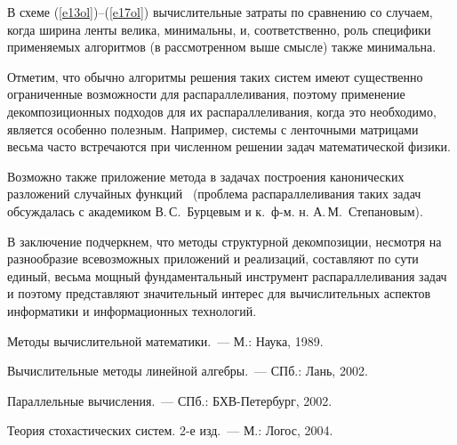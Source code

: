 \begin{multicols}{2}
     В схеме (\ref{e13ol})--(\ref{e17ol}) вычислительные затраты по
сравнению со случаем, когда ширина ленты велика, минимальны, и,
соответственно, роль специфики применяемых алгоритмов (в рассмотренном
выше смысле) также минимальна. 

Отметим, что обычно алгоритмы решения
\mbox{таких} систем имеют существенно ограниченные %
возможности для
распараллеливания, поэтому применение декомпозиционных подходов для их
распа\-рал\-ле\-ли\-ва\-ния, когда это необходимо, является особен\-но полезным.
Например, системы с ленточными матрицами весьма часто встречаются при
численном решении задач математической фи\-зики. 
{

}

Возможно также
приложение метода в задачах построения канонических разложений
случайных функций~\cite{4ol} (проблема распараллеливания таких задач
обсуждалась с академиком В.\,С.~Бурцевым и к.\ ф-м. н. А.\,М.~Степановым).

     В заключение подчеркнем, что методы структурной декомпозиции,
несмотря на разнообразие всевозможных приложений и реализаций,
со\-став\-ля\-ют по сути единый, весьма мощный фундаментальный инструмент
распараллеливания задач и поэтому представляют значительный интерес для
вычислительных аспектов информатики и информационных технологий.

\vspace*{-6pt}
{\small\frenchspacing
{%
\begin{thebibliography}{9}
Методы вычислительной математики.~--- М.: Наука, 1989.

Вычислительные методы линейной алгебры.~--- СПб.: Лань, 2002.

Параллельные вычисления.~--- СПб.: БХВ-Петербург, 2002.

\label{end\stat}

Теория стохастических систем. 2-е изд.~--- М.: Логос, 2004.
\end{thebibliography}
}
}
\end{multicols}